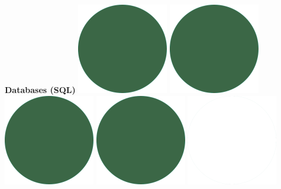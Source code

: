\documentclass[]{commands}
\begin{document}
\begin{aside}
\textbf{Databases (SQL)}\hfill
\includegraphics[scale=0.11]{img/IPSGreenDots.png}
\includegraphics[scale=0.11]{img/IPSGreenDots.png}
\includegraphics[scale=0.11]{img/IPSGreenDots.png}
\includegraphics[scale=0.11]{img/IPSGreenDots.png}
\includegraphics[scale=0.11]{img/WhiteDots.png}


\end{aside}
\end{document}
